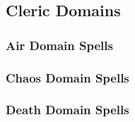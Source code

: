 \subsection{Cleric Domains}\label{Cleric Domains}

\begin{comment}
\subsubsection{Example Domain}
\parhead{Domain Power}
\parhead{Channelled Domain Power}
\parhead[Greate] Domain Power}
\parhead[Greate] Channelled Domain Power}
\parhead{Domain Mastery}
\begin{spelllist}
    \spellhead[1]{}
    \spellhead[1]{}
    \spellhead[2]{}
    \spellhead[2]{}
    \spellhead[3]{}
    \spellhead[3]{}
    \spellhead[4]{}
    \spellhead[4]{}
    \spellhead[5]{}
    \spellhead[5]{}
    \spellhead[6]{}
    \spellhead[6]{}
    \spellhead[7]{}
    \spellhead[7]{}
    \spellhead[8]{}
    \spellhead[8]{}
    \spellhead[9]{}
    \spellhead[9]{}
\end{spelllist}
\end{comment}

\subsubsection{Air Domain Spells}

\begin{spelllist}
    \SLgentledescent[1]
    \SLwindstrike[2]
    \SLcalllightning[3]
    \SLairwalk[4]
    \SLstormlord[5]
    \SLchainlightning[6]
    \SLavatarofwind[7]
    \SLreversegravity[8]
    \SLstormofvengeance[9]
\end{spelllist}

\subsubsection{Chaos Domain Spells}

\begin{spelllist}
    \SLprotectionfromalignment[1]
    \SLswarmofbats[2]
    \SLchaoshammer[3]
    \SLconfusion[4]
    \SLcacaphonicword[5]
    \SLprismaticspray[6]
    \SLdiscordantsong[7]
    \SLreversegravity[8]
    \SLavatarofchaos[9]
\end{spelllist}

\subsubsection{Death Domain Spells}

